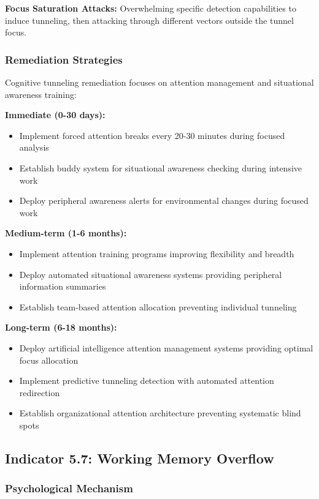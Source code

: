 \documentclass[11pt,a4paper]{article}
\begin{document}
\textbf{Focus Saturation Attacks:} Overwhelming specific detection capabilities to induce tunneling, then attacking through different vectors outside the tunnel focus.

\subsubsection{Remediation Strategies}

Cognitive tunneling remediation focuses on attention management and situational awareness training:

\textbf{Immediate (0-30 days):}
\begin{itemize}
\item Implement forced attention breaks every 20-30 minutes during focused analysis
\item Establish buddy system for situational awareness checking during intensive work
\item Deploy peripheral awareness alerts for environmental changes during focused work
\end{itemize}

\textbf{Medium-term (1-6 months):}
\begin{itemize}
\item Implement attention training programs improving flexibility and breadth
\item Deploy automated situational awareness systems providing peripheral information summaries
\item Establish team-based attention allocation preventing individual tunneling
\end{itemize}

\textbf{Long-term (6-18 months):}
\begin{itemize}
\item Deploy artificial intelligence attention management systems providing optimal focus allocation
\item Implement predictive tunneling detection with automated attention redirection
\item Establish organizational attention architecture preventing systematic blind spots
\end{itemize}

\subsection{Indicator 5.7: Working Memory Overflow}

\subsubsection{Psychological Mechanism}
\end{document}
